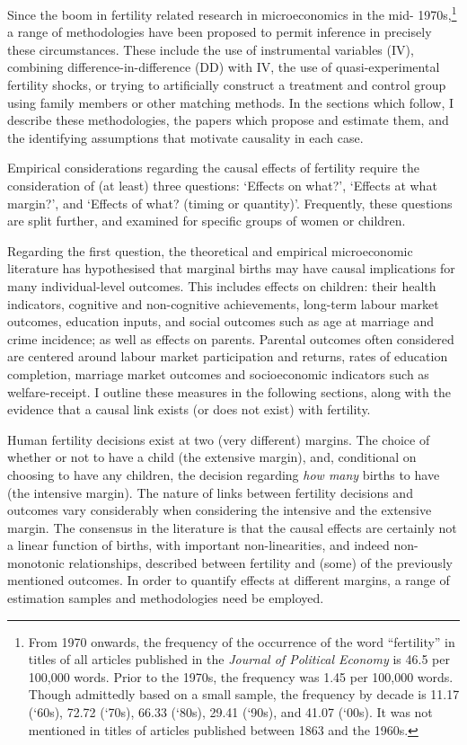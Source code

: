 Since the boom in fertility related research in microeconomics in the mid-%
1970s,\footnote{From 1970 onwards, the frequency of the occurrence of the word 
``fertility'' 
in titles of all articles published in the \emph{Journal of Political Economy} 
is 46.5 per 100,000 words. Prior to the 1970s, the frequency was 1.45 per 
100,000 words. Though admittedly based on a small sample, the frequency by 
decade is 11.17 (`60s), 72.72 (`70s), 66.33 (`80s), 29.41 (`90s), and 41.07 
(`00s). It was not mentioned in titles of articles published between 1863 and 
the 1960s.} a range of methodologies have been proposed to permit inference 
in precisely these circumstances. These include the use of instrumental 
variables (IV), combining difference-in-difference (DD) with IV, the use of 
quasi-experimental fertility shocks, or trying to artificially construct a 
treatment and control group using family members or other matching 
methods.  In the sections which follow, I describe these methodologies, the 
papers which propose and estimate them, and the identifying assumptions that
motivate causality in each case.

Empirical considerations regarding the causal effects of fertility require the
consideration of (at least) three questions: `Effects on what?', `Effects at
what margin?', and `Effects of what? (timing or quantity)'.  Frequently, these 
questions are split further, and examined for specific groups of women or 
children.

Regarding the first question, the theoretical and empirical microeconomic 
literature has hypothesised that marginal births may have causal implications 
for many individual-level outcomes.  This includes effects on children: their 
health indicators, cognitive and non-cognitive achievements, long-term labour 
market outcomes, education inputs, and social outcomes such as age at marriage 
and crime incidence; as well as effects on parents. Parental outcomes often 
considered are centered around labour market participation and returns, rates 
of education completion, marriage market outcomes and socioeconomic indicators 
such as welfare-receipt.  I outline these measures in the following sections, 
along with the evidence that a causal link exists (or does not exist) with 
fertility.

Human fertility decisions exist at two (very different) margins.  The choice of
whether or not to have a child (the extensive margin), and, conditional on 
choosing to have any children, the decision regarding \emph{how many} births
to have (the intensive margin).  The nature of links between fertility decisions
and outcomes vary considerably when considering the intensive and the extensive
margin.  The consensus in the literature is that the causal effects are 
certainly not a linear function of births, with important non-linearities, and 
indeed non-monotonic relationships, described between fertility and (some) of 
the previously mentioned outcomes. In order to quantify effects at different 
margins, a range of estimation samples and methodologies need be employed.  

